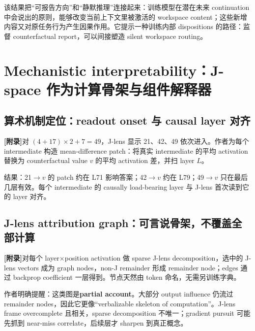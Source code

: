 \documentclass[10.5pt,a4paper]{ctexart}
\newcommand{\AppendixTag}{\textbf{[附录]}}
\begin{document}
\begin{keybox}[title={\bfseries Counterfactual reflection 的机制意义}]
该结果把“可报告方向”和“静默推理”连接起来：训练模型在潜在未来 continuation 中会说出的原则，能够改变当前上下文里被激活的 workspace content；这些新增内容又对原任务行为产生因果作用。它提示一种训练内部 dispositions 的路径：监督 counterfactual report，可以间接塑造 silent workspace routing。
\end{keybox}

\section{Mechanistic interpretability：J-space 作为计算骨架与组件解释器}

\subsection{算术机制定位：readout onset 与 causal layer 对齐}
\AppendixTag 对 $(4+17)\times2+7=49$，J-lens 显示 21、42、49 依次进入。作者为每个 intermediate 构造 mean-difference patch：将真实 intermediate 的平均 activation 替换为 counterfactual value $v$ 的平均 activation 差，并扫 layer $L$。

结果：21$\to v$ 的 patch 约在 L71 影响答案；42$\to v$ 约在 L79；49$\to v$ 只在最后几层有效。每个 intermediate 的 causally load-bearing layer 与 J-lens 首次读到它的 layer 对齐。

\subsection{J-lens attribution graph：可言说骨架，不覆盖全部计算}
\AppendixTag 对每个 layer$\times$position activation 做 sparse J-lens decomposition，选中的 J-lens vectors 成为 graph nodes，non-J remainder 形成 remainder node；edges 通过 backprop coefficient 一层得到。节点天然由 token 命名，无需另训练字典。

作者明确提醒：这类图是\textbf{partial account}。大部分 output influence 仍流过 remainder nodes，因此它更像“verbalizable skeleton of computation”。J-lens frame overcomplete 且相关，sparse decomposition 不唯一；gradient pursuit 可能先抓到 near-miss correlate，后续层才 sharpen 到真正概念。
\end{document}
